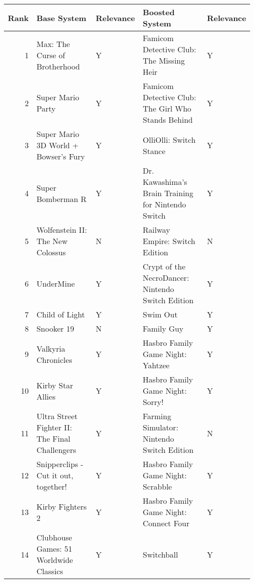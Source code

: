 \begin{tabular}{rllll}
\toprule
 Rank &                                    Base System & Relevance &                                     Boosted System & Relevance \\
\midrule
    1 &                  Max: The Curse of Brotherhood &         Y &           Famicom Detective Club: The Missing Heir &         Y \\
    2 &                              Super Mario Party &         Y & Famicom Detective Club: The Girl Who Stands Behind &         Y \\
    3 &           Super Mario 3D World + Bowser's Fury &         Y &                            OlliOlli: Switch Stance &         Y \\
    4 &                              Super Bomberman R &         Y & Dr. Kawashima's Brain Training for Nintendo Switch &         Y \\
    5 &               Wolfenstein II: The New Colossus &         N &                     Railway Empire: Switch Edition &         N \\
    6 &                                      UnderMine &         Y &  Crypt of the NecroDancer: Nintendo Switch Edition &         Y \\
    7 &                                 Child of Light &         Y &                                           Swim Out &         Y \\
    8 &                                     Snooker 19 &         N &                                         Family Guy &         Y \\
    9 &                            Valkyria Chronicles &         Y &                  Hasbro Family Game Night: Yahtzee &         Y \\
   10 &                              Kirby Star Allies &         Y &                   Hasbro Family Game Night: Sorry! &         Y \\
   11 & Ultra Street Fighter II: The Final Challengers &         Y &         Farming Simulator: Nintendo Switch Edition &         N \\
   12 &           Snipperclips - Cut it out, together! &         Y &                 Hasbro Family Game Night: Scrabble &         Y \\
   13 &                               Kirby Fighters 2 &         Y &             Hasbro Family Game Night: Connect Four &         Y \\
   14 &         Clubhouse Games: 51 Worldwide Classics &         Y &                                         Switchball &         Y \\

\end{tabular}
